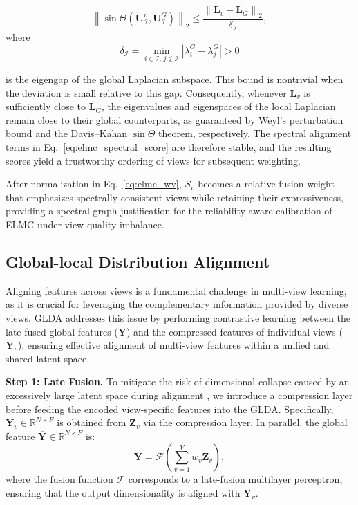 \documentclass[10pt, journal, compsoc]{IEEEtran}
\newif\ifshowrevision
\newenvironment{revpar}{%
  \ifshowrevision
    \color{blue}%
  \fi
}{}
\begin{document}
\begin{equation}
\left\|
\sin\Theta
\left(
\mathbf{U}_{\mathcal{I}}^{v},
\mathbf{U}_{\mathcal{I}}^{G}
\right)
\right\|_{2}
\leq
\frac{
\left\|
\mathbf{L}_{v}
-
\mathbf{L}_{G}
\right\|_{2}
}{
\delta_{\mathcal{I}}
},
\label{eq:elmc_davis_kahan}
\end{equation}
where
\begin{equation}
\delta_{\mathcal{I}}
=
\min_{i\in\mathcal{I},\,j\notin\mathcal{I}}
\left|
\lambda_i^{G}
-
\lambda_j^{G}
\right|
>
0
\label{eq:elmc_eigengap}
\end{equation}
\begin{revpar} is the eigengap of the global Laplacian subspace. This bound is nontrivial when the deviation is small relative to this gap. Consequently, whenever $\mathbf{L}_{v}$ is sufficiently close to $\mathbf{L}_{G}$, the eigenvalues and eigenspaces of the local Laplacian remain close to their global counterparts, as guaranteed by Weyl's perturbation bound and the Davis--Kahan $\sin\Theta$ theorem, respectively. The spectral alignment terms in Eq.~\eqref{eq:elmc_spectral_score} are therefore stable, and the resulting scores yield a trustworthy ordering of views for subsequent weighting.

After normalization in Eq.~\eqref{eq:elmc_wv}, $S_v$ becomes a relative fusion weight that emphasizes spectrally consistent views while retaining their expressiveness, providing a spectral-graph justification for the reliability-aware calibration of ELMC under view-quality imbalance. \end{revpar}

\subsection{Global-local Distribution Alignment}
Aligning features across views is a fundamental challenge in multi-view learning, as it is crucial for leveraging the complementary information provided by diverse views. GLDA addresses this issue by performing contrastive learning \cite{khosla2020supervised,li2021contrastive} between the late-fused global features ($\overline{\boldsymbol{Y}}$) and the compressed features of individual views ($\boldsymbol{Y}_{v}$), ensuring effective alignment of multi-view features within a unified and shared latent space.

\textbf{Step 1: Late Fusion.} To mitigate the risk of dimensional collapse caused by an excessively large latent space during alignment \cite{chen2020simple,jing2021understanding}, we introduce a compression layer before feeding the encoded view-specific features into the GLDA. Specifically, $\boldsymbol{Y}_{v}\in \mathbb{R}^{N \times F}$ is obtained from $\boldsymbol{Z}_{v}$ via the compression layer. In parallel, the global feature $\overline{\boldsymbol{Y}}\in \mathbb{R}^{N \times F}$ is:
\begin{equation}
\overline{\boldsymbol{Y}}= \mathcal{F}\left( \sum_{v=1}^{V}w_{v}\boldsymbol{Z}_{v}\right),
\end{equation}
where the fusion function $\mathcal{F}$ corresponds to a late-fusion multilayer perceptron, ensuring that the output dimensionality is aligned with $\boldsymbol{Y}_{v}$.
\end{document}
